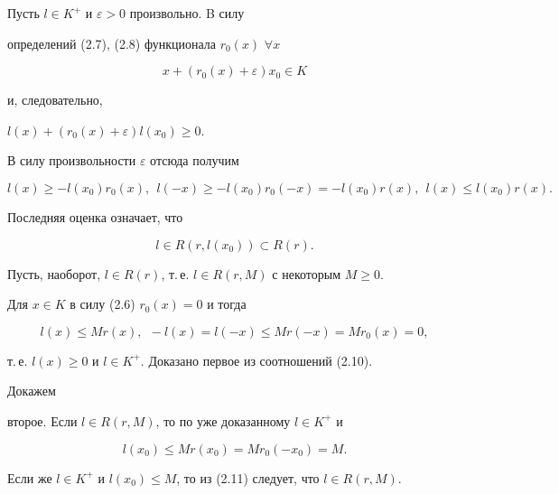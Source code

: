  


\begin{pf} 


Пусть $l\in K^+$ и $\varepsilon>0$ произвольно. B силу 


определений (2.7), (2.8) функционала $r_0(x)$ $\forall x$ 


$$ 


x+(r_0(x)+\varepsilon)x_0\in K 


$$ 


и, следовательно, 


$l(x)+(r_0(x)+\varepsilon)l(x_0)\ge0$. 


В силу произвольности $\varepsilon$ отсюда получим 


\begin{equation} 


l(x)\ge -l(x_0)r_0(x), 


\ \ l(-x)\ge -l(x_0)r_0(-x)=-l(x_0)r(x), 


\ \ l(x)\le l(x_0)r(x). 


\end{equation} 


Последняя оценка означает, что 


\begin{equation} 


l\in R(r,l(x_0))\subset R(r). 


\end{equation} 


 


Пусть, наоборот, $l\in R(r)$, т.\,е. $l\in R(r,M)$ с некоторым $M\ge0$. 


Для $x\in K$ в силу (2.6) $r_0(x)=0$ и тогда 


$$ 


l(x)\le M r(x),\ \ -l(x)=l(-x)\le M r(-x)=M r_0(x)=0, 


$$ 


т.\,е. $l(x)\ge0$ и $l\in K^+$. Доказано первое из соотношений (2.10). 


Докажем 


второе. Если $l\in R(r,M)$, то по уже доказанному $l\in K^+$ и 


$$ 


l(x_0)\le M r(x_0)=M r_0(-x_0)=M. 


$$ 


Если же $l\in K^+$ и $l(x_0)\le M$, то из (2.11) следует, что $l\in 


R(r,M)$. 


\end{pf} 


